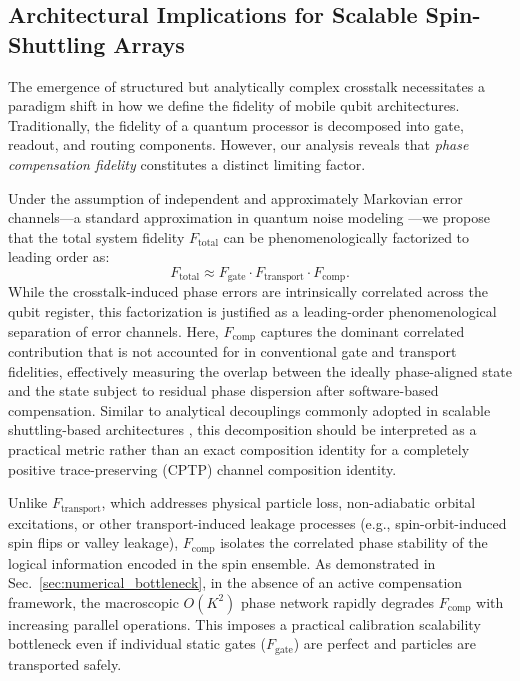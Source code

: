\documentclass[a4paper,twocolumn,11pt]{quantumarticle}
\begin{document}
\subsection{Architectural Implications for Scalable Spin-Shuttling Arrays}
\label{sec:architectural_implications}

The emergence of structured but analytically complex crosstalk necessitates a paradigm shift in how we define the fidelity of mobile qubit architectures. Traditionally, the fidelity of a quantum processor is decomposed into gate, readout, and routing components. However, our analysis reveals that \textit{phase compensation fidelity} constitutes a distinct limiting factor.

Under the assumption of independent and approximately Markovian error channels—a standard approximation in quantum noise modeling \cite{nielsen_quantum_2012}—we propose that the total system fidelity $F_{\text{total}}$ can be phenomenologically factorized to leading order as:
\begin{equation}
    F_{\text{total}} \approx F_{\text{gate}} \cdot F_{\text{transport}} \cdot F_{\text{comp}}.
    \label{eq:fidelity_decomposition}
\end{equation}
While the crosstalk-induced phase errors are intrinsically correlated across the qubit register, this factorization is justified as a leading-order phenomenological separation of error channels. Here, $F_{\text{comp}}$ captures the dominant correlated contribution that is not accounted for in conventional gate and transport fidelities, effectively measuring the overlap between the ideally phase-aligned state and the state subject to residual phase dispersion after software-based compensation. Similar to analytical decouplings commonly adopted in scalable shuttling-based architectures \cite{pino_demonstration_2021, langrock_blueprint_2023}, this decomposition should be interpreted as a practical metric rather than an exact composition identity for a completely positive trace-preserving (CPTP) channel composition identity.

Unlike $F_{\text{transport}}$, which addresses physical particle loss, non-adiabatic orbital excitations, or other transport-induced leakage processes (e.g., spin-orbit-induced spin flips or valley leakage), $F_{\text{comp}}$ isolates the correlated phase stability of the logical information encoded in the spin ensemble. As demonstrated in Sec.~\ref{sec:numerical_bottleneck}, in the absence of an active compensation framework, the macroscopic $O(K^2)$ phase network rapidly degrades $F_{\text{comp}}$ with increasing parallel operations. This imposes a practical calibration scalability bottleneck even if individual static gates ($F_{\text{gate}}$) are perfect and particles are transported safely.
\end{document}
